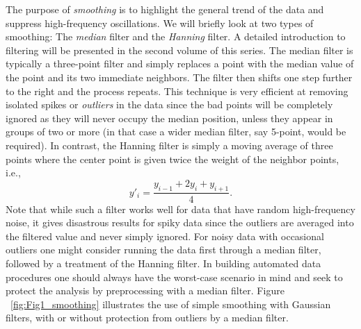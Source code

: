 	The purpose of \emph{smoothing} is to highlight the general trend of the data and suppress
high-frequency oscillations.  We will briefly look at two types of smoothing: The \emph{median} filter and the \emph{Hanning} 
filter. A detailed introduction to filtering will be presented in the second volume of this series.
The median filter is typically a three-point filter and simply replaces a point 
with the median value of the point and its two immediate neighbors.  The filter then shifts one step 
further to the right and the process repeats.  This technique is very efficient at removing isolated 
spikes or \emph{outliers} in the data since the bad points will be completely ignored as they will never 
occupy the median position, unless they appear in groups of two or more (in that case a wider 
median filter, say 5-point, would be required).  In contrast, the Hanning filter is simply a moving average of 
three points where the center point is given twice the weight of the neighbor points, i.e.,
\begin{equation}	 
y'_i = \frac{y_{i-1} + 2y_i + y_{i + 1}}{4}.
\end{equation}
Note that while such a filter works well for data that have random high-frequency noise, it gives 
disastrous results for spiky data since the outliers are averaged into the filtered value and never 
simply ignored.  For noisy data with occasional outliers one might consider running the data first 
through a median filter, followed by a treatment of the Hanning filter.  In building automated data
procedures one should always have the worst-case scenario in mind and seek to protect the analysis by
preprocessing with a median filter.  Figure ~\ref{fig:Fig1_smoothing} illustrates the use
of simple smoothing with Gaussian filters, with or without protection from outliers by a median filter.

